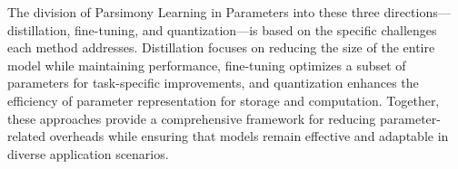 The division of Parsimony Learning in Parameters into these three directions—distillation, fine-tuning, and quantization—is based on the specific challenges each method addresses. Distillation focuses on reducing the size of the entire model while maintaining performance, fine-tuning optimizes a subset of parameters for task-specific improvements, and quantization enhances the efficiency of parameter representation for storage and computation. Together, these approaches provide a comprehensive framework for reducing parameter-related overheads while ensuring that models remain effective and adaptable in diverse application scenarios.
